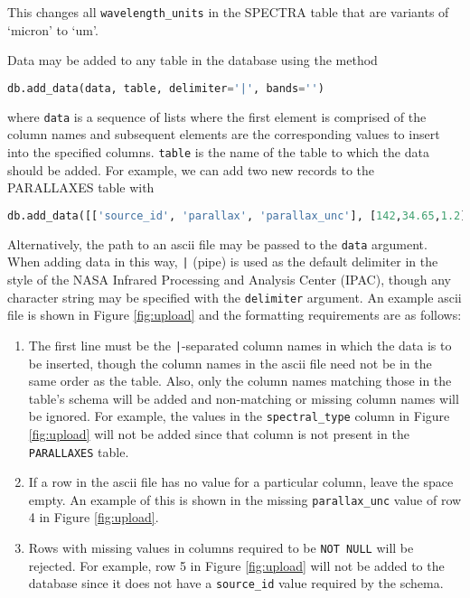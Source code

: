 \documentclass[iop,revtex4,natbib209]{emulateapj}
\begin{document}
This changes all \texttt{wavelength\_units} in the SPECTRA table that are variants of `micron' to `um'. 

Data may be added to any table in the database using the method

\begin{lstlisting}[language=Python]
db.add_data(data, table, delimiter='|', bands='')
\end{lstlisting}

where \texttt{data} is a sequence of lists where the first element is comprised of the column names and subsequent elements are the corresponding values to insert into the specified columns. \texttt{table} is the name of the table to which the data should be added. For example, we can add two new records to the PARALLAXES table with

\begin{lstlisting}[language=Python]
db.add_data([['source_id', 'parallax', 'parallax_unc'], [142,34.65,1.2], [21,94.22,0.5]], 'parallaxes')
\end{lstlisting}

Alternatively, the path to an ascii file may be passed to the \texttt{data} argument. When adding data in this way, \texttt{|} (pipe) is used as the default delimiter in the style of the NASA Infrared Processing and Analysis Center (IPAC), though any character string may be specified with the \texttt{delimiter} argument. An example ascii file is shown in Figure \ref{fig:upload} and the formatting requirements are as follows:

\begin{enumerate}

\item The first line must be the \texttt{|}-separated column names in which the data is to be inserted, though the column names in the ascii file need not be in the same order as the table. Also, only the column names matching those in the table's schema will be added and non-matching or missing column names will be ignored. For example, the values in the \texttt{spectral\_type} column in Figure \ref{fig:upload} will not be added since that column is not present in the \texttt{PARALLAXES} table.

\item If a row in the ascii file has no value for a particular column, leave the space empty. An example of this is shown in the missing \texttt{parallax\_unc} value of row 4 in Figure \ref{fig:upload}.

\item Rows with missing values in columns required to be \texttt{NOT NULL} will be rejected. For example, row 5 in Figure \ref{fig:upload} will not be added to the database since it does not have a \texttt{source\_id} value required by the schema.

\end{enumerate}
\end{document}
